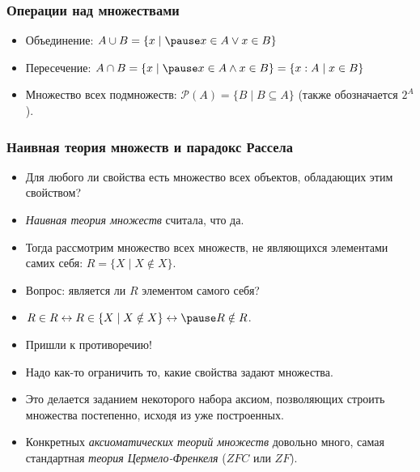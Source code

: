 \documentclass[10pt]{beamer}
\begin{document}
\begin{frame}
    \frametitle{Операции над множествами}
    \begin{itemize}
        \item Объединение: $A \cup B = \{x \mid \pause x \in A \lor x \in B\}$
        \item Пересечение: $A \cap B = \{x \mid \pause x \in A \land x \in B\} = \{x : A \mid x \in B\}$
        \item Множество всех подмножеств: $\mathcal{P}(A) = \{ B \mid B \subseteq A \}$ (также обозначается $2^A$).
    \end{itemize}
\end{frame}

\begin{frame}
    \frametitle{Наивная теория множеств и парадокс Рассела}
    \begin{itemize}
        \item Для любого ли свойства есть множество всех объектов, обладающих этим свойством?
        \item \emph{Наивная теория множеств} считала, что да.
        \item Тогда рассмотрим множество всех множеств, не являющихся элементами самих себя: $R = \{X \mid X \notin X\}$.
        \item Вопрос: является ли $R$ элементом самого себя?
        \pause
        \item $R \in R \leftrightarrow R \in \{X \mid X \notin X\} \leftrightarrow \pause R \notin R$.
        \item Пришли к противоречию!
        \pause
        \item Надо как-то ограничить то, какие свойства задают множества.
        \item Это делается заданием некоторого набора аксиом, позволяющих строить множества постепенно, исходя из уже построенных.
        \item Конкретных \emph{аксиоматических теорий множеств} довольно много, самая стандартная \emph{теория Цермело-Френкеля} ($ZFC$ или $ZF$). 
    \end{itemize}
\end{frame}
\end{document}
